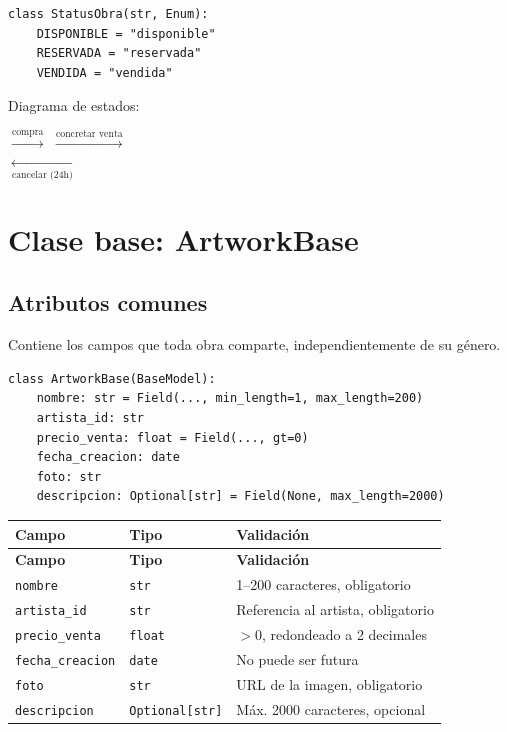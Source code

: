 \documentclass[12pt,a4paper]{article}
\begin{document}
\begin{lstlisting}
class StatusObra(str, Enum):
    DISPONIBLE = "disponible"
    RESERVADA = "reservada"
    VENDIDA = "vendida"
\end{lstlisting}

Diagrama de estados:

\begin{center}
\ttfamily
{}
$\xrightarrow{\text{compra}}$
$\xrightarrow{\text{concretar venta}}$
\\[4pt]
\hspace*{6.5cm}
$\xleftarrow[\text{cancelar (24h)}]{}$
\end{center}

\section{Clase base: ArtworkBase}

\subsection{Atributos comunes}

Contiene los campos que toda obra comparte, independientemente de su género.

\begin{lstlisting}
class ArtworkBase(BaseModel):
    nombre: str = Field(..., min_length=1, max_length=200)
    artista_id: str
    precio_venta: float = Field(..., gt=0)
    fecha_creacion: date
    foto: str
    descripcion: Optional[str] = Field(None, max_length=2000)
\end{lstlisting}

\begin{longtable}{lll}
\toprule
\textbf{Campo} & \textbf{Tipo} & \textbf{Validación} \\
\midrule
\endfirsthead
\toprule
\textbf{Campo} & \textbf{Tipo} & \textbf{Validación} \\
\midrule
\endhead
\bottomrule
\endfoot
\texttt{nombre} & \texttt{str} & 1--200 caracteres, obligatorio \\
\texttt{artista\_id} & \texttt{str} & Referencia al artista, obligatorio \\
\texttt{precio\_venta} & \texttt{float} & $> 0$, redondeado a 2 decimales \\
\texttt{fecha\_creacion} & \texttt{date} & No puede ser futura \\
\texttt{foto} & \texttt{str} & URL de la imagen, obligatorio \\
\texttt{descripcion} & \texttt{Optional[str]} & Máx. 2000 caracteres, opcional \\
\end{longtable}
\end{document}

